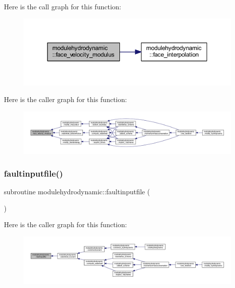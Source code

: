 Here is the call graph for this function\+:\nopagebreak
\begin{figure}[H]
\begin{center}
\leavevmode
\includegraphics[width=345pt]{namespacemodulehydrodynamic_a59e16bb385ccdef967139d17eb850973_cgraph}
\end{center}
\end{figure}
Here is the caller graph for this function\+:\nopagebreak
\begin{figure}[H]
\begin{center}
\leavevmode
\includegraphics[width=350pt]{namespacemodulehydrodynamic_a59e16bb385ccdef967139d17eb850973_icgraph}
\end{center}
\end{figure}
\mbox{\label{namespacemodulehydrodynamic_a639b9213d8587d0f1a43c4b8f842d43f}} 
\subsubsection{\texorpdfstring{faultinputfile()}{faultinputfile()}}
{\footnotesize\ttfamily subroutine modulehydrodynamic\+::faultinputfile (\begin{DoxyParamCaption}{ }\end{DoxyParamCaption})\hspace{0.3cm}{\ttfamily [private]}}

Here is the caller graph for this function\+:\nopagebreak
\begin{figure}[H]
\begin{center}
\leavevmode
\includegraphics[width=350pt]{namespacemodulehydrodynamic_a639b9213d8587d0f1a43c4b8f842d43f_icgraph}
\end{center}
\end{figure}
\mbox{\label{namespacemodulehydrodynamic_af90f1292b4b75aa67f18563e3030e056}} 
